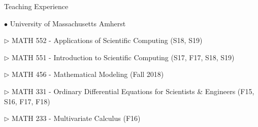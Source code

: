 \documentclass[10pt]{article} %
\newenvironment{outerlist}[1][\enskip\textbullet]%
        {\begin{itemize}[#1]}{\end{itemize}%
         \vspace{-.6\baselineskip}}
\newenvironment{innerlist}[1][\enskip\textbullet]%
        {\begin{compactitem}[#1]}{\end{compactitem}}
\begin{document}
\begin{section}{Teaching Experience}
\begin{outerlist}
\item[$\bullet$] 
University of Massachusetts Amherst
\begin{innerlist}
\item[$\triangleright$] MATH 552 - Applications of Scientific Computing (S18, S19)
\item[$\triangleright$] MATH 551 - Introduction to Scientific Computing (S17, F17, S18, S19)
\item[$\triangleright$] MATH 456 - Mathematical Modeling (Fall 2018)
\item[$\triangleright$] MATH 331 - Ordinary Differential Equations for Scientists \& Engineers (F15, S16, F17, F18)
\item[$\triangleright$] MATH 233 - Multivariate Calculus (F16)

\end{innerlist}
\end{outerlist}
\end{section}
\end{document}
